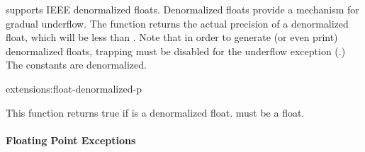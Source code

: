 \cmucl{} supports IEEE denormalized floats.  Denormalized floats
provide a mechanism for gradual underflow.  The \clisp{}
 function returns the actual precision of a
denormalized float, which will be less than .
Note that in order to generate (or even print) denormalized floats,
trapping must be disabled for the underflow exception
(.)  The \clisp{}
 constants are
denormalized.

\begin{defun}{extensions:}{float-denormalized-p}{}
  
  This function returns true if  is a denormalized float.
   must be a float.
\end{defun}


\paragraph{Floating Point Exceptions}
\label{float-traps}

